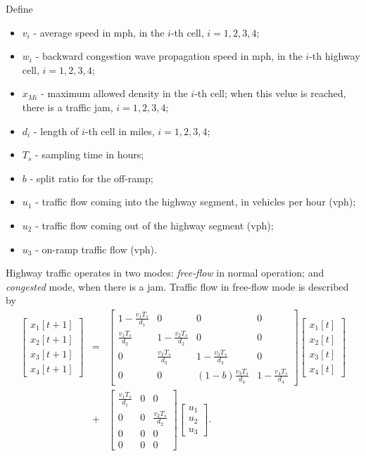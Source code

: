 Define
\begin{itemize}
\item $v_i$ - average  speed in mph,
in the $i$-th cell, $i=1,2,3,4$;
\item $w_i$ - backward congestion wave propagation speed in mph,
in the $i$-th highway cell, $i=1,2,3,4$;
\item $x_{Mi}$ - maximum allowed density in the $i$-th cell;
when this velue is reached, there is a traffic jam, $i=1,2,3,4$;
\item $d_i$ - length of $i$-th cell in miles, $i=1,2,3,4$;
\item $T_s$ - sampling time in hours;
\item $b$ - split ratio for the off-ramp;
\item $u_1$ - traffic flow coming into the highway segment,
in vehicles per hour (vph);
\item $u_2$ - traffic flow coming out of the highway segment (vph);
\item $u_3$ - on-ramp traffic flow (vph).
\end{itemize}
Highway traffic operates in two modes: {\it free-flow} in normal operation;
and {\it congested} mode, when there is a jam.
Traffic flow in free-flow mode is described by
\begin{eqnarray}
\left[\begin{array}{c}
x_1[t+1]\\
x_2[t+1]\\
x_3[t+1]\\
x_4[t+1]\end{array}\right] & = & \left[\begin{array}{cccc}
1-\frac{v_1T_s}{d_1} & 0 & 0 & 0\\
\frac{v_1T_s}{d_2} & 1-\frac{v_2T_s}{d_2} & 0 & 0\\
0 & \frac{v_2T_s}{d_3} & 1-\frac{v_3T_s}{d_3} & 0\\
0 & 0 & (1-b)\frac{v_3T_s}{d_4} & 1-\frac{v_4T_s}{d_4}\end{array}\right]
\left[\begin{array}{c}
x_1[t]\\
x_2[t]\\
x_3[t]\\
x_4[t]\end{array}\right] \nonumber\\
& + & \left[\begin{array}{ccc}
\frac{v_1T_s}{d_1} & 0 & 0\\
0 & 0 & \frac{v_2T_s}{d_2}\\
0 & 0 & 0\\
0 & 0 & 0\end{array}\right]\left[\begin{array}{c}
u_1\\
u_2\\
u_3\end{array}\right]. \label{fflow}
\end{eqnarray}
